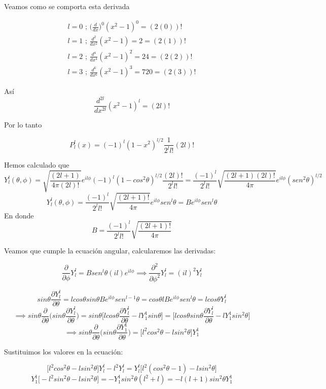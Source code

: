 \documentclass[10pt]{article}
\begin{document}
Veamos como se comporta esta derivada

\begin{align*}
    l=0 \text{ ; } \bigg( \frac{d}{dx} \bigg)^{0}(x^{2}-1)^{0}=(2(0))! \\
    l=1 \text{ ; } \frac{d^{2}}{dx^{2}}(x^{2}-1) = 2=(2(1))! \\
    l=2 \text{ ; } \frac{d^{4}}{dx^{4}}(x^{2}-1)^{2}=24=(2(2))! \\
    l=3 \text{ ; } \frac{d^{6}}{dx^{6}}(x^{2}-1)^{3}=720=(2(3))!
\end{align*}

Así $$\frac{d^{2l}}{dx^{2l}}(x^{2}-1)^{l}=(2l)!$$

Por lo tanto 

$$P_{l}^{l}(x)=(-1)^{l}(1-x^{2})^{l/2}\frac{1}{2^{l}l!}(2l)!$$

Hemos calculado que 
$$Y_{l}^{l}(\theta,\phi)=\sqrt{\frac{(2l+1)}{4\pi(2l)!}}e^{il\phi}(-1)^{l}(1-cos^{2}\theta)^{l/2}\frac{(2l)!}{2^{l}l!}=\frac{(-1)^{l}}{2^{l}l!}\sqrt{\frac{(2l+1)(2l)!}{4\pi}}e^{il\phi}(sen^{2}\theta)^{l/2}$$
$$Y_{l}^{l}(\theta,\phi)=\frac{(-1)^{l}}{2^{l}l!}\sqrt{\frac{(2l+1)!}{4\pi}}e^{il\phi}sen^{l}\theta=Be^{il\phi}sen^{l}\theta$$
En donde $$B=\frac{(-1)^{l}}{2^{l}l!}\sqrt{\frac{(2l+1)!}{4\pi}}$$

Veamos que cumple la ecuación angular, calcularemos las derivadas:

$$\frac{\partial }{\partial \phi}Y_{l}^{l}=Bsen^{l}\theta (il)e^{il\phi} \implies \frac{\partial^{2} }{\partial \phi^{2}}Y_{l}^{l}=(il)^{2}Y_{l}^{l}$$

$$sin\theta \frac{\partial Y_{l}^{l}}{\partial \theta}=lcos\theta sin\theta Be^{il\phi}sen^{l-1}\theta=cos\theta lBe^{il\phi}sen^{l}\theta=lcos\theta Y_{l}^{l}$$
$$\implies sin\theta \frac{ \partial}{\partial \theta}\bigg( sin\theta \frac{\partial Y_{l}^{l}}{\partial \theta} \bigg)=sin\theta\bigg[lcos\theta  \frac{\partial Y_{l}^{l}}{\partial \theta}-lY_{1}^{1}sin\theta \bigg]=\bigg[lcos\theta sin \theta \frac{\partial Y_{l}^{l}}{\partial \theta}-lY_{1}^{1}sin^{2}\theta \bigg]$$
$$\implies sin\theta \frac{\partial}{\partial \theta}\bigg( sin\theta \frac{\partial Y_{1}^{1}}{\partial \theta} \bigg)=\bigg[ l^{2}cos^{2}\theta -l sin^{2}\theta\bigg]Y_{1}^{1}$$

Sustituimos los valores en la ecuación: 

$$\bigg[ l^{2}cos^{2}\theta -l sin^{2}\theta\bigg]Y_{l}^{l}-l^{2}Y_{l}^{l}=Y_{l}^{l}\bigg[ l^{2}(cos^{2}\theta -1)-lsin^{2}\theta \bigg]$$
$$Y_{1}^{1}\bigg[ -l^{2}sin^{2}\theta -lsin^{2}\theta \bigg]=-Y_{1}^{1}sin^{2}\theta (l^2+l)=-l(l+1)sin^{2}\theta Y_{1}^{1}$$
\end{document}
